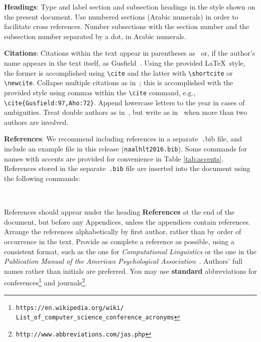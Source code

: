 \documentclass[11pt]{article}
\newcommand\BibTeX{B{\sc ib}\TeX}
\begin{document}
{\bf Headings}: Type and label section and subsection headings in the
style shown on the present document.  Use numbered sections (Arabic
numerals) in order to facilitate cross references. Number subsections
with the section number and the subsection number separated by a dot,
in Arabic numerals. 

{\bf Citations}: Citations within the text appear
in parentheses as~\cite{Gusfield:97} or, if the author's name appears in
the text itself, as Gusfield~.  Using the provided \LaTeX\ style, the former is accomplished using
{\small\verb|\cite|} and the latter with {\small\verb|\shortcite|} or {\small\verb|\newcite|}.  Collapse multiple citations as in~\cite{Gusfield:97,Aho:72}; this is accomplished with the provided style using commas within the {\small\verb|\cite|} command, e.g., {\small\verb|\cite{Gusfield:97,Aho:72}|}.  
Append lowercase letters to the year in cases of ambiguities.  
Treat double authors as in~\cite{Aho:72}, but write as 
in~\cite{Chandra:81} when more than two authors are involved.  

\textbf{References}:  We recommend
including references in a separate~{\small\texttt .bib} file, and include an example file 
in this release ({\small\tt naalhlt2016.bib}).  Some commands
for names with accents are provided for convenience in Table \ref{tab:accents}.  
References stored in the separate~{\small\tt .bib} file are inserted into the document using the following commands:

\small
\begin{verbatim}


\end{verbatim}
\normalsize 

References should appear under the heading {\bf References} at the 
end of the document, but before any Appendices, unless the appendices contain references.  
Arrange the references alphabetically
by first author, rather than by order of occurrence in the text.  %
Provide as complete a reference as possible, using a consistent format,
such as the one for {\em Computational Linguistics\/} or the one in the 
{\em Publication Manual of the American 
Psychological Association\/}~\cite{APA:83}.  Authors' full names rather than initials are preferred.  You may use
{\bf standard} abbreviations for conferences\footnote{\scriptsize {\tt https://en.wikipedia.org/wiki/ \\ \-\hspace{.75cm} List\_of\_computer\_science\_conference\_acronyms}} and journals\footnote{\tt http://www.abbreviations.com/jas.php}.
\end{document}
